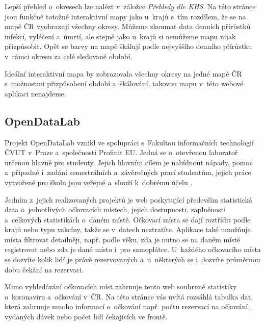 Lepší přehled o~okresech lze nalézt v~záložce \emph{Přehledy dle KHS}. Na této stránce jsou funkčně totožné interaktivní mapy jako u~krajů s~tím rozdílem, že se na mapě ČR vyobrazují všechny okresy. Můžeme zkoumat data denních přírůstků infekcí, vyléčení a~úmrtí, ale stejně jako u~krajů si nemůžeme mapu nijak přizpůsobit. Opět se barvy na mapě škálují podle nejvyššího denního přírůstku v~rámci okresu za celé sledované období.

Ideální interaktivní mapa by zobrazovala všechny okresy na jedné mapě ČR s~možnostmi přizpůsobení období a~škálování, takovou mapu v~této webové aplikaci nenajdeme.

\subsection{OpenDataLab}
Projekt OpenDataLab vznikl ve spolupráci s~Fakultou informačních technologií ČVUT v~Praze a~společností Profinit EU. Jedná se o~otevřenou laboratoř určenou hlavně pro studenty. Jejich hlavním cílem je nabídnout nápady, pomoc a~případně i~zadání semestrálních a~závěrečných prací studentům, jejich práce vytvořené pro školu jsou veřejné a~slouží k~dobrému účelu \cite{opendatalab}.

Jedním z~jejich realizovaných projektů je web poskytující především statistická data o~jednotlivých očkovacích místech, jejich dostupnosti, zaplněnosti a~celkových statistikách o~daném místě. Očkovací místa se dají roztřídit podle krajů nebo typu vakcíny, takže se v~datech neztratíte. Aplikace také umožňuje místa filtrovat detailněji, např. podle věku, zda je nutno se na daném místě registrovat nebo zda je dané místo i~pro samoplátce. U~každého očkovacího místa se dozvíte kolik lidí je právě rezervovaných a~u~některých se i~dozvíte průměrnou dobu čekání na rezervaci.

Mimo vyhledávání očkovacích míst zahrnuje tento web souhrnné statistiky o~koronaviru a~očkování v~ČR. Na této stránce vás uvítá rozsáhlá tabulka dat, která zahrnuje mnoho informací o~očkování např. počtu rezervací na očkování, vydaných dávek nebo počet lidí čekajících ve frontě. 

